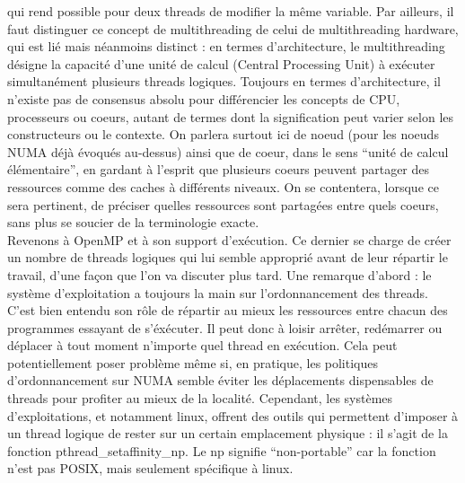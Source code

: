 \documentclass{report}
\begin{document}
qui rend possible pour deux threads de modifier la même variable. Par ailleurs, il faut distinguer
ce concept de multithreading de celui de multithreading hardware, qui est lié mais néanmoins
distinct : en termes d'architecture, le multithreading désigne la capacité d'une unité de calcul
(Central Processing Unit) à exécuter simultanément plusieurs threads logiques. Toujours en termes
d'architecture, il n'existe pas de consensus absolu pour différencier les concepts de CPU,
processeurs ou coeurs, autant de termes dont la signification peut varier selon les constructeurs
ou le contexte. On parlera surtout ici de noeud (pour les noeuds NUMA déjà évoqués au-dessus) 
ainsi que de coeur, dans le sens ``unité de calcul élémentaire'', en gardant à l'esprit que 
plusieurs coeurs peuvent partager des ressources comme des caches à différents niveaux. On se 
contentera, lorsque ce sera pertinent, de préciser quelles ressources sont partagées entre
quels coeurs, sans plus se soucier de la terminologie exacte.
\\Revenons à OpenMP et à son support d'exécution. Ce dernier se charge de créer un nombre de 
threads logiques qui lui semble approprié avant de leur répartir le travail, d'une façon que
l'on va discuter plus tard. Une remarque d'abord : le système d'exploitation a toujours la 
main sur l'ordonnancement des threads. C'est bien entendu son rôle de répartir au mieux les
ressources entre chacun des programmes essayant de s'éxécuter. Il peut donc à loisir arrêter,
redémarrer ou déplacer à tout moment n'importe quel thread en exécution. Cela peut potentiellement
poser problème même si, en pratique, les politiques d'ordonnancement sur NUMA semble éviter les 
déplacements dispensables de threads pour profiter au mieux de la localité. Cependant, les systèmes
d'exploitations, et notamment linux, offrent des outils qui permettent d'imposer à un thread logique
de rester sur un certain emplacement physique : il s'agit de la fonction pthread\_setaffinity\_np. Le
np signifie ``non-portable'' car la fonction n'est pas POSIX, mais seulement spécifique à linux.
\end{document}
